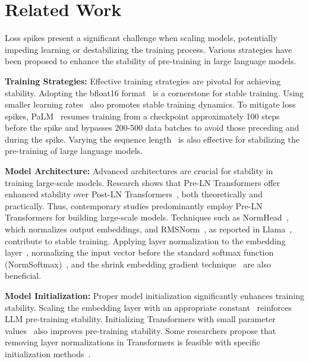 \section{Related Work}
Loss spikes present a significant challenge when scaling models, potentially impeding learning or destabilizing the training process. Various strategies have been proposed to enhance the stability of pre-training in large language models.

\textbf{Training Strategies:} Effective training strategies are pivotal for achieving stability. Adopting the bfloat16 format~\cite{wang2019bfloat16} is a cornerstone for stable training. Using smaller learning rates~\cite{wortsman2023small, zhang2022opt} also promotes stable training dynamics. To mitigate loss spikes, PaLM~\cite{chowdhery2023palm} resumes training from a checkpoint approximately 100 steps before the spike and bypasses 200-500 data batches to avoid those preceding and during the spike. Varying the sequence length~\cite{li2022stability} is also effective for stabilizing the pre-training of large language models.

\textbf{Model Architecture:} Advanced architectures are crucial for stability in training large-scale models. Research shows that Pre-LN Transformers offer enhanced stability over Post-LN Transformers~\cite{xiong2020layer, vaswani2017attention, liu2020understanding}, both theoretically and practically. Thus, contemporary studies predominantly employ Pre-LN Transformers for building large-scale models. Techniques such as NormHead~\cite{yang2023baichuan}, which normalizes output embeddings, and RMSNorm~\cite{zhang2019root}, as reported in Llama~\cite{touvron2023llama1}, contribute to stable training. Applying layer normalization to the embedding layer~\cite{scao2022language}, normalizing the input vector before the standard softmax function (NormSoftmax)~\cite{jiang2023normsoftmax}, and the shrink embedding gradient technique~\cite{zeng2022glm} are also beneficial.

\textbf{Model Initialization:} Proper model initialization significantly enhances training stability. Scaling the embedding layer with an appropriate constant~\cite{takase2023spike} reinforces LLM pre-training stability. Initializing Transformers with small parameter values~\cite{nguyen2019transformers} also improves pre-training stability. Some researchers propose that removing layer normalizations in Transformers is feasible with specific initialization methods~\cite{zhang2019fixup, huang2020improving}.

